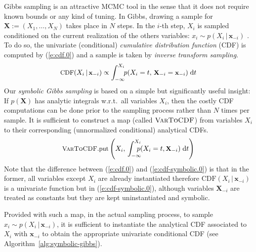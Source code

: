\documentclass[]{article}
\newcommand{\bvec}[1]{\textbf{#1}}
\newcommand{\pr}{p}
\newcommand{\dd}{\;\mathrm{d}} %
\begin{document}
Gibbs sampling is an attractive MCMC tool in the sense that it does not require known bounds or any kind of tuning.
In Gibbs, drawing a sample for $\bvec{X} := (X_1, \ldots, X_N)$ takes place in $N$ steps.
In the $i$-th step, $X_i$ is sampled conditioned on the current realization of the others variables:
$x_i \sim \pr(X_i \,|\, \bvec{x}_{-i})$
\citep{bishop2006pattern}.
To do so, the univariate (conditional) 
\emph{cumulative distribution function} (CDF)
is computed by (\ref{e:cdf.0}) and a sample is taken by \emph{inverse transform sampling}. 
\begin{equation} \footnotesize
\label{e:cdf.0}
\text{CDF}(X_i  \,|\, \bvec{x}_{-i}) 
\propto
\int_{-\infty}^{X_i} \!\! \pr(X_i = t, \,\bvec{X}_{-i} = \bvec{x}_{-i})  \dd  t
\end{equation} 
%
Our \emph{symbolic Gibbs sampling} is based on a simple but significantly useful insight:
If $\pr(\bvec{X})$
has analytic integrals w.r.t.\ all variables $X_i$,
then the costly CDF computations can be done prior to the sampling process rather than $N$ times per sample. 
It is sufficient to construct a map (called $\textsc{VarToCDF}$) from variables $X_i$ to their corresponding (unnormalized conditional) analytical CDFs. 
\begin{equation} \footnotesize
\label{e:cdf-symbolic.0}	
\textsc{VarToCDF}\text{.put}
\left(
X_i, \, %
\int_{-\infty}^{X_i} \!\!\!\!\! \pr(X_i = t , \bvec{X}_{-i}) \dd  t
\right)
\end{equation} 
Note that the difference between (\ref{e:cdf.0}) and (\ref{e:cdf-symbolic.0}) is that in the former, 
all variables except $X_i$ are already instantiated therefore 
$\text{CDF}(X_i  \,|\, \bvec{x}_{-i})$ is a univariate function but in  (\ref{e:cdf-symbolic.0}), 
although variables $\bvec{X}_{-i}$ are treated as constants but they are kept uninstantiated and symbolic.

Provided with such a map, in the actual sampling process, 
to sample $x_i \sim \pr(X_i \,|\, \bvec{x}_{-i})$,
it is sufficient to instantiate the analytical CDF associated to $X_i$ with  
$\bvec{x}_{-i}$ to obtain the appropriate univariate conditional CDF
(see Algorithm~\ref{alg:symbolic-gibbs}).
\end{document}

